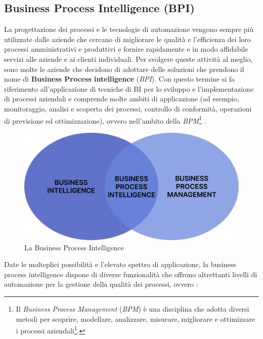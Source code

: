 \subsection{Business Process Intelligence (BPI)}

La progettazione dei processi e le tecnologie di automazione vengono sempre più utilizzate dalle aziende che cercano di migliorare le qualità e l'efficienza dei loro processi amministrativi e produttivi e fornire rapidamente e in modo affidabile servizi alle aziende e ai clienti individuali. Per svolgere queste attività al meglio, sono molte le aziende che decidono di adottare delle soluzioni che prendono il nome di \textbf{Business Process intelligence} (\textit{BPI}). Con questo termine si fa riferimento all'applicazione di tecniche di BI per lo sviluppo e l'implementazione di processi aziendali e comprende molte ambiti di applicazione (ad esempio, monitoraggio, analisi e scoperta dei processi, controllo di conformità, operazioni di previsione ed ottimizzazione), ovvero nell'ambito della \textit{BPM}\footnote{Il \textit{Business Process Management} (\textit{BPM}) è una disciplina che adotta diversi metodi per scoprire, modellare, analizzare, misurare, migliorare e ottimizzare i processi aziendali\footnote{\textit{URL Fonte}: https://tinyurl.com/2p952mtc}.} \cite{academiaedu_bpi_definition}.

\begin{figure}[H]
    \centering
    \includegraphics[width=0.75\linewidth]{figure//capitolo_3/Business Process Intelligence.pdf}
    \caption{La Business Process Intelligence}
    \label{fig:Business Process Intelligence}
\end{figure}

Date le molteplici possibilità e l'elevato spettro di applicazione, la business process intelligence dispone di diverse funzionalità che offrono altrettanti livelli di automazione per la gestione della qualità dei processi, ovvero \cite{academiaedu_bpi_feautures}:

